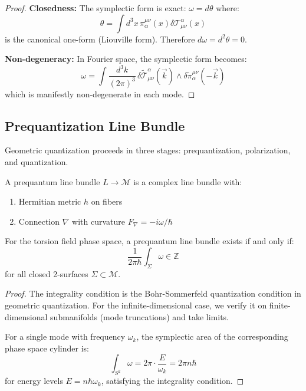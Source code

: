 \begin{proof}
\textbf{Closedness:} The symplectic form is exact: $\omega = d\theta$ where:
\begin{equation}
    \theta = \int d^3x \, \pi_\alpha^{\mu\nu}(x) \delta \mathcal{T}^\alpha_{\mu\nu}(x)
\end{equation}
is the canonical one-form (Liouville form). Therefore $d\omega = d^2\theta = 0$.

\textbf{Non-degeneracy:} In Fourier space, the symplectic form becomes:
\begin{equation}
    \omega = \int \frac{d^3k}{(2\pi)^3} \, \delta \tilde{\mathcal{T}}^\alpha_{\mu\nu}(\vec{k}) \wedge \delta \tilde{\pi}_\alpha^{\mu\nu}(-\vec{k})
\end{equation}
which is manifestly non-degenerate in each mode.
\end{proof}

\subsection{Prequantization Line Bundle}

Geometric quantization proceeds in three stages: prequantization, polarization, and quantization.

\begin{definition}
A prequantum line bundle $L \to \mathcal{M}$ is a complex line bundle with:
\begin{enumerate}
    \item Hermitian metric $h$ on fibers
    \item Connection $\nabla$ with curvature $F_\nabla = -i\omega/\hbar$
\end{enumerate}
\end{definition}

\begin{theorem}
For the torsion field phase space, a prequantum line bundle exists if and only if:
\begin{equation}
    \frac{1}{2\pi\hbar} \int_\Sigma \omega \in \mathbb{Z}
\end{equation}
for all closed 2-surfaces $\Sigma \subset \mathcal{M}$.
\end{theorem}

\begin{proof}
The integrality condition is the Bohr-Sommerfeld quantization condition in geometric quantization. For the infinite-dimensional case, we verify it on finite-dimensional submanifolds (mode truncations) and take limits.

For a single mode with frequency $\omega_k$, the symplectic area of the corresponding phase space cylinder is:
\begin{equation}
    \int_{S^2} \omega = 2\pi \cdot \frac{E}{\omega_k} = 2\pi n \hbar
\end{equation}
for energy levels $E = n\hbar\omega_k$, satisfying the integrality condition.
\end{proof}

